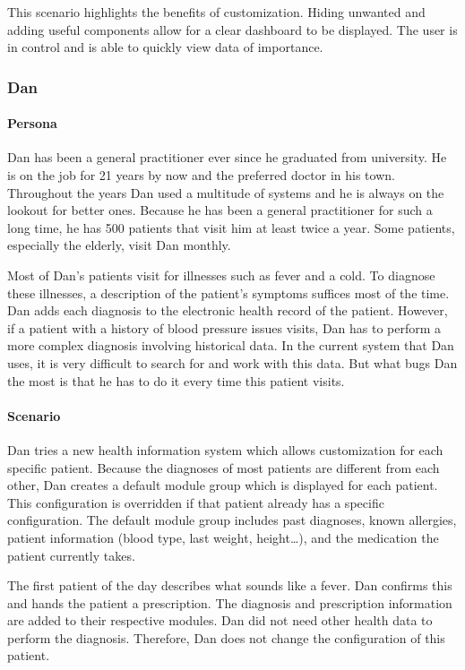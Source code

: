         \noindent This scenario highlights the benefits of customization. Hiding unwanted and adding useful components allow for a clear dashboard to be displayed. The user is in control and is able to quickly view data of importance.
        
        \subsubsection{Dan}

        \paragraph{Persona} Dan has been a general practitioner ever since he graduated from university. He is on the job for 21 years by now and the preferred doctor in his town. Throughout the years Dan used a multitude of systems and he is always on the lookout for better ones. Because he has been a general practitioner for such a long time, he has 500 patients that visit him at least twice a year. Some patients, especially the elderly, visit Dan monthly.

        Most of Dan's patients visit for illnesses such as fever and a cold. To diagnose these illnesses, a description of the patient's symptoms suffices most of the time. Dan adds each diagnosis to the electronic health record of the patient. However, if a patient with a history of blood pressure issues visits, Dan has to perform a more complex diagnosis involving historical data. In the current system that Dan uses, it is very difficult to search for and work with this data. But what bugs Dan the most is that he has to do it every time this patient visits.

        \paragraph{Scenario} Dan tries a new health information system which allows customization for each specific patient. Because the diagnoses of most patients are different from each other, Dan creates a default module group which is displayed for each patient. This configuration is overridden if that patient already has a specific configuration. The default module group includes past diagnoses, known allergies, patient information (blood type, last weight, height\ldots), and the medication the patient currently takes.

        The first patient of the day describes what sounds like a fever. Dan confirms this and hands the patient a prescription. The diagnosis and prescription information are added to their respective modules. Dan did not need other health data to perform the diagnosis. Therefore, Dan does not change the configuration of this patient.

